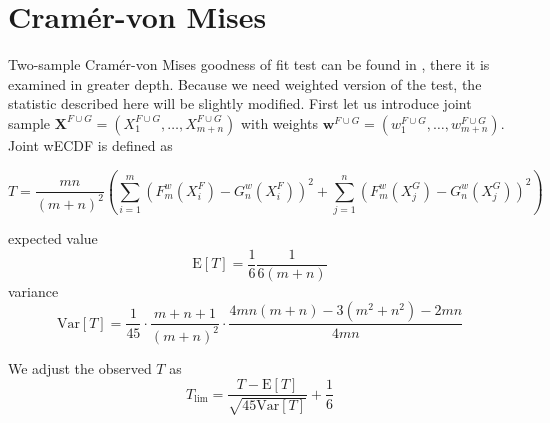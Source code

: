 \section{Cram\'{e}r-von Mises}
Two-sample Cram\'er-von Mises goodness of fit test can be found in \cite{Anderson62}, there it is examined in greater depth. Because we need weighted version of the test, the statistic described here will be slightly modified. First let us introduce joint sample $\mathbf{X}^{F\cup G} = (X^{F\cup G}_1, \ldots, X^{F\cup G}_{m+n})$ with weights $\mathbf{w}^{F\cup G} = (w^{F\cup G}_1,\ldots, w^{F\cup G}_{m+n}).$ Joint wECDF is defined as 

\begin{equation}
T  = \frac{mn}{(m+n)^2}\left( \sum_{i=1}^m \left( F^w_m(X^F_i) - G^w_n(X^F_i)\right)^2 + \sum_{j=1}^n \left( F^w_m(X^G_j) - G^w_n(X^G_j)\right)^2 \right)
\end{equation}

expected value
\begin{equation}
\mathrm{E} [T] = \frac{1}{6} \frac{1}{6(m+n)}
\end{equation}
variance 
\begin{equation}
\mathrm{Var} [T] = \frac{1}{45} \cdot \frac{m+n+1}{(m+n)^2} \cdot \frac{4mn(m+n) - 3(m^2 + n^2)-2mn}{4mn}
\end{equation}

We adjust the observed $T$ as
\begin{equation}
T_\mathrm{lim} = \frac{T-\mathrm{E}[T]}{\sqrt{45\mathrm{Var}[T]}} + \frac{1}{6}
\end{equation}






